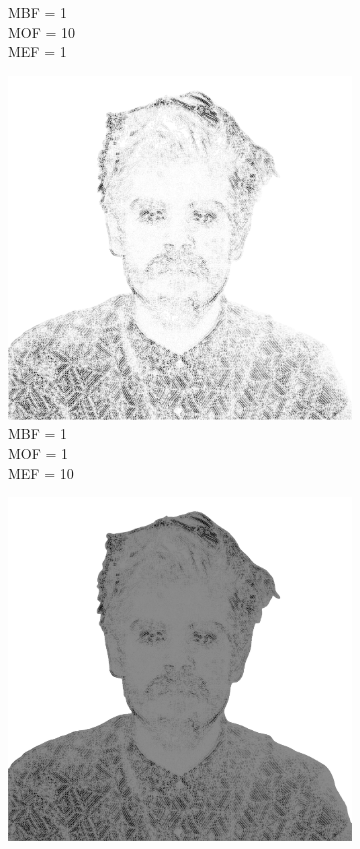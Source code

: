 \begin{figure}[htb]
\begin{subfigure}{0.32\textwidth}
        \caption{MBF = 1 \\ MOF = 10 \\ MEF = 1}
        \label{mine-param-taco-e}
    \end{subfigure}
    \begin{subfigure}{0.32\textwidth}
        \centering
        \includegraphics[width = \textwidth]{img/4-mine/taco-mask/taco_mask_c20_inv0_bg1_obj1_ed10.png}
        \caption{MBF = 1 \\ MOF = 1 \\ MEF = 10}
        \label{mine-param-taco-f}
    \end{subfigure}
    \begin{subfigure}{0.32\textwidth}
        \centering
        \includegraphics[width = \textwidth]{img/4-mine/taco-mask/taco_mask_c20_inv0_bg1_obj10_ed10.png}

\end{subfigure}
\end{figure}
